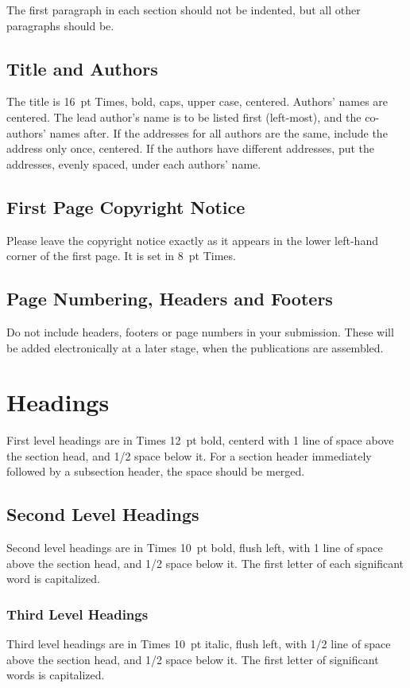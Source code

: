 \documentclass{article}
\begin{document}
The first paragraph in each section should not be indented, 
but all other paragraphs should be.

\subsection{Title and Authors}
The title is 16~pt Times, bold, caps, upper case, centered. Authors' names are centered. The lead author's name is to be listed first (left-most), and the co-authors' names after. If the addresses for all authors are the same, include the address only once, centered. If the authors have different addresses, put the addresses, evenly spaced, under each authors' name.

\subsection{First Page Copyright Notice}
Please leave the copyright notice exactly as it appears in the lower left-hand corner of the first page. It is set in 8~pt Times.

\subsection{Page Numbering, Headers and Footers}
Do not include headers, footers or page numbers in your submission. These will be added electronically at a later stage, when the publications are assembled.

\section{Headings}
First level headings are in Times 12~pt bold, centerd with 1 line of space above the section head, and 1/2 space below it.
For a section header immediately followed by a subsection header, the space should be merged.

\subsection{Second Level Headings}
Second level headings are in Times 10~pt bold, flush left, with 1 line of space above the section head, and 1/2 space below it. The first letter of each significant word is capitalized.

\subsubsection{Third Level Headings}
Third level headings are in Times 10~pt italic, flush left, with 1/2 line of space above the section head, and 1/2 space below it. The first letter of significant words is capitalized.
\end{document}
